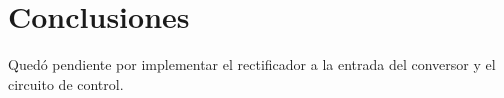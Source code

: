 \section{Conclusiones}



Quedó pendiente por implementar el rectificador a la entrada del conversor y el circuito de control.